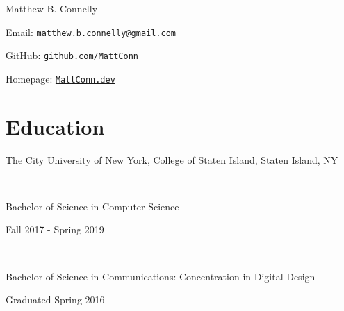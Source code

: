 \documentclass[letterpaper]{article}
\def\name{Matthew B. Connelly}
\renewenvironment{itemize}{
  \begin{list}{}{
    \setlength{\leftmargin}{1.5em}
  }
}{
  \end{list}
}
\begin{document}

\centerline{\huge \name}

\vspace{0.25in}

\begin{itemize}
  \item Email: \href{mailto:matthew.b.connelly@gmail.com}{\tt matthew.b.connelly@gmail.com}

  GitHub: \href{https://github.com/mattconn/}{\tt github.com/MattConn}

  Homepage: \href{https://mattconn.dev/}{\tt MattConn.dev}
\end{itemize}


\section*{Education}

\begin{itemize}
  \item The City University of New York, College of Staten Island, Staten Island, NY

  \

  \indent\indent Bachelor of Science in Computer Science

  Fall 2017 - Spring 2019 

  \

  Bachelor of Science in Communications: Concentration in Digital Design

  Graduated Spring 2016
\end{itemize}
\end{document}
